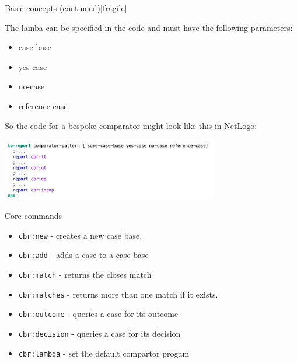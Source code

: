 \documentclass[usenames,dvipsnames,10pt]{beamer} %
\begin{document}
\begin{frame}{Basic concepts (continued)}[fragile]

    The lamba can be specified in the code and must have the following
    parameters:

    \begin{itemize}
        \item case-base
        \item yes-case
        \item no-case
        \item reference-case
    \end{itemize}

    So the code for a bespoke comparator might look like this in NetLogo: 

    \includegraphics[width=9.5cm]{img/blank-comparator.png}

\end{frame}

\begin{frame}{Core commands}

    \begin{itemize}
        \item {\color{red}\texttt{cbr:new}} - creates a new case base.
        \item {\color{red}\texttt{cbr:add}} - adds a case to a case base
        \item {\color{red}\texttt{cbr:match}} - returns the closes match
        \item {\color{red}\texttt{cbr:matches}} - returns more than one match if it exists.
        \item {\color{red}\texttt{cbr:outcome}} - queries a case for its outcome
        \item {\color{red}\texttt{cbr:decision}} - queries a case for its decision
        \item {\color{red}\texttt{cbr:lambda}} - set the default compartor progam
    \end{itemize}

\end{frame}
\end{document}
